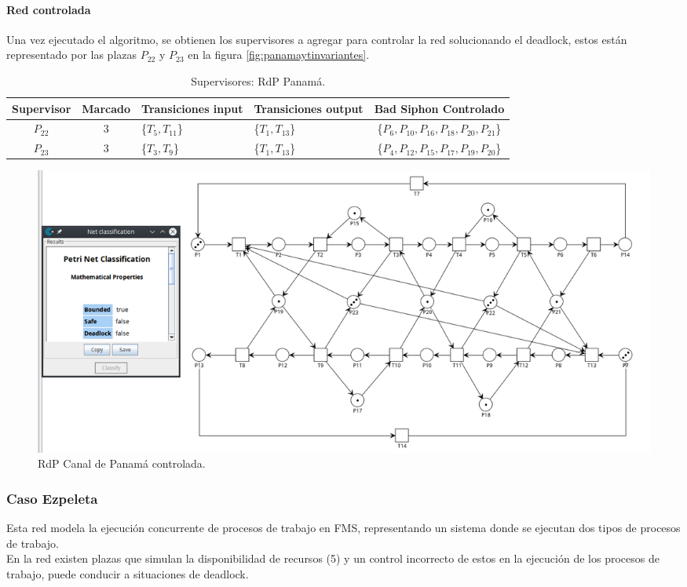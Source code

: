 \paragraph{Red controlada}
\hfill  
\par Una vez ejecutado el algoritmo, se obtienen los supervisores a agregar para controlar la red solucionando el deadlock, estos están representado por las plazas $P_{22}$ y $P_{23}$ en la figura \ref{fig:panamaytinvariantes}.

\begin{table}[H]
    \centering
    \begin{tabular}{|c|c|P{2.2cm}|P{2.2cm}|c|}
    \hline
    \textbf{Supervisor} & \textbf{Marcado} & \textbf{Transiciones input} & \textbf{Transiciones output} & \textbf{Bad Siphon Controlado}  \\  \hline
    $P_{22}$ & 3 & \{$T_{5}, T_{11}$\} & \{$T_{1}, T_{13}$\} & \{$P_6,P_{10},P_{16},P_{18},P_{20},P_{21}$\} \\ 
    \hline
    $P_{23}$ & 3 & \{$T_{3}, T_{9}$\} & \{$T_{1}, T_{13}$\} & \{$P_4,P_{12},P_{15},P_{17},P_{19},P_{20}$\} \\ 
    \hline
    \end{tabular}
    \caption{Supervisores: RdP Panamá.}
    \label{tab:panama}
    
    \end{table}

\begin{figure}[H]
	\centering
	\includegraphics[scale=0.4]{Figures/algoritmo3/Panama2.png}
	\caption{RdP Canal de Panamá controlada.}
	\label{fig:panamacontrolada}
 \end{figure}
 
 \subsubsection{Caso Ezpeleta}
Esta red modela la ejecución concurrente de procesos de trabajo en FMS, representando un sistema donde se ejecutan dos tipos de procesos de trabajo. \\
En la red existen plazas que simulan la disponibilidad de recursos (5) y un control incorrecto de estos en la ejecución de los procesos de trabajo, puede conducir a situaciones de deadlock.

